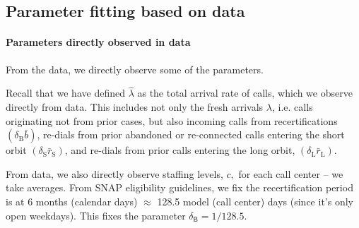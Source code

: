 \documentclass[manuscript,screen,authorversion]{acmart}
\newcommand{\tr}{\textcolor{red}}
\begin{document}
\subsection{Parameter fitting based on data}


\paragraph{Parameters directly observed in data} 

From the data, we directly observe some of the parameters. 




Recall that we have defined $\hat\lambda$ as the total arrival rate of calls, which we observe directly from data. This includes not only the fresh arrivals $\lambda$, i.e. calls originating not from prior cases, but also incoming calls from recertifications $(\delta_{\mathrm{B}} \bar{b})$, re-dials from prior abandoned or re-connected calls entering the short orbit $(\delta_{\mathrm{S}} \bar{r}_{\mathrm{S}})$, and re-dials from prior calls entering the long orbit, $(\delta_{\mathrm{L}} \bar{r}_{\mathrm{L}})$. 

From data, we also directly observe staffing levels, $c,$ for each call center -- we take averages. From SNAP eligibility guidelines, we fix the recertification period is at 6 months (calendar days) $\approx$ 128.5 model (call center) days (since it’s only
open weekdays). This fixes the parameter $\delta_{\mathsf{B}} = 1/128.5$.
\end{document}

